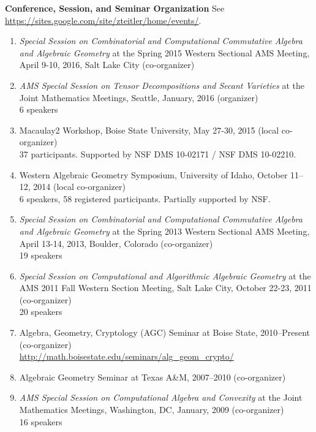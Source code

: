 \documentclass[12pt]{article}
\begin{document}
\textbf{Conference, Session, and Seminar Organization}
See \url{https://sites.google.com/site/zteitler/home/events/}.
\begin{enumerate}
\item \textit{Special Session on Combinatorial and Computational
Commutative Algebra and Algebraic Geometry}
at the Spring 2015 Western Sectional AMS Meeting,
April 9-10, 2016, Salt Lake City (co-organizer)


\item \textit{AMS Special Session on Tensor Decompositions and Secant Varieties}
at the Joint Mathematics Meetings, Seattle, January, 2016 (organizer) \\
6 speakers

\item Macaulay2 Workshop, Boise State University, May 27-30, 2015 (local co-organizer) \\
37 participants. Supported by NSF DMS 10-02171 / NSF DMS 10-02210.

\item Western Algebraic Geometry Symposium, University of Idaho, October 11--12, 2014 (local co-organizer) \\
6 speakers, 58 registered participants. Partially supported by NSF.

\item \textit{Special Session on Combinatorial and Computational
Commutative Algebra and Algebraic Geometry}
at the Spring 2013 Western Sectional AMS Meeting,
April 13-14, 2013, Boulder, Colorado (co-organizer) \\
19 speakers

\item \textit{Special Session on Computational and Algorithmic Algebraic Geometry}
at the AMS 2011 Fall Western Section Meeting, Salt Lake City, October 22-23, 2011 (co-organizer) \\
20 speakers

\item Algebra, Geometry, Cryptology (AGC) Seminar at Boise State, 2010--Present (co-organizer) \\
\url{http://math.boisestate.edu/seminars/alg_geom_crypto/}

\item Algebraic Geometry Seminar at Texas A\&M, 2007--2010 (co-organizer)

\item \textit{AMS Special Session on Computational Algebra and Convexity}
at the Joint Mathematics Meetings, Washington, DC, January, 2009 (co-organizer) \\
16 speakers


\end{enumerate}
\end{document}
